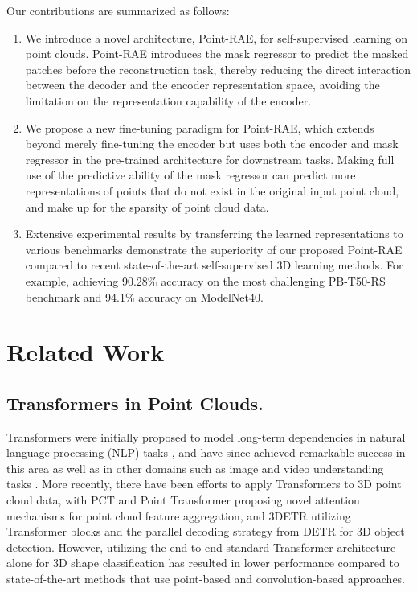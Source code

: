 \documentclass[sigconf, screen]{acmart}
\begin{document}
Our contributions are summarized as follows:
\begin{enumerate}[leftmargin=1em,parsep=1pt]
\item[] We introduce a novel architecture, Point-RAE, for self-supervised learning on point clouds. 
Point-RAE introduces the mask regressor to predict the masked patches before the reconstruction task, thereby reducing the direct interaction between the decoder and the encoder representation space, avoiding the limitation on the representation capability of the encoder.
\item[] We propose a new fine-tuning paradigm for Point-RAE, which extends beyond merely fine-tuning the encoder but uses both the encoder and mask regressor in the pre-trained architecture for downstream tasks.
Making full use of the predictive ability of the mask regressor can predict more representations of points that do not exist in the original input point cloud, and make up for the sparsity of point cloud data.
\item[] 
Extensive experimental results by transferring the learned representations to various benchmarks demonstrate the superiority of our proposed Point-RAE compared to recent state-of-the-art self-supervised 3D learning methods. For example, achieving 90.28\% accuracy on the most challenging PB-T50-RS benchmark and 94.1\% accuracy on ModelNet40.

\end{enumerate}


\section{Related Work}

\subsection{Transformers in Point Clouds.} Transformers were initially proposed to model long-term dependencies in natural language processing (NLP) tasks \cite{vaswani2017attention}, and have since achieved remarkable success in this area \cite{devlin2018bert, radford2018improving} as well as in other domains such as image and video understanding tasks \cite{dosovitskiy2020image, jiang2021transgan, radford2021learning, steiner2021train, wang2021max}. More recently, there have been efforts to apply Transformers to 3D point cloud data, with PCT \cite{guo2021pct} and Point Transformer \cite{zhao2021point} proposing novel attention mechanisms for point cloud feature aggregation, and 3DETR \cite{misra2021end} utilizing Transformer blocks and the parallel decoding strategy from DETR \cite{carion2020end} for 3D object detection.
However, utilizing the end-to-end standard Transformer architecture alone for 3D shape classification has resulted in lower performance compared to state-of-the-art methods that use point-based \cite{ma2022rethinking} and convolution-based \cite{qiu2021geometric} approaches.
\end{document}

